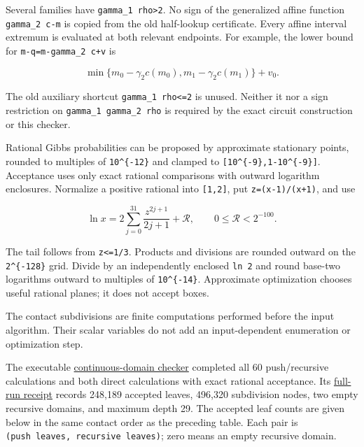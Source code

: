 Several families have \texttt{gamma\_1\ rho\textgreater{}2}. No sign of the generalized affine function \texttt{gamma\_2\ c-m} is copied from the old half-lookup certificate. Every affine interval extremum is evaluated at both relevant endpoints. For example, the lower bound for \texttt{m-q=m-gamma\_2\ c+v} is

\[
\min\{m_0-\gamma_2c(m_0),m_1-\gamma_2c(m_1)\}+v_0.
 \tag{XSS19}
\]

The old auxiliary shortcut \texttt{gamma\_1\ rho\textless{}=2} is unused. Neither it nor a sign restriction on \texttt{gamma\_1\ gamma\_2\ rho} is required by the exact circuit construction or this checker.

Rational Gibbs probabilities can be proposed by approximate stationary points, rounded to multiples of \texttt{10\^{}\{-12\}} and clamped to \texttt{{[}10\^{}\{-9\},1-10\^{}\{-9\}{]}}. Acceptance uses only exact rational comparisons with outward logarithm enclosures. Normalize a positive rational into \texttt{{[}1,2{]}}, put \texttt{z=(x-1)/(x+1)}, and use

\[
\ln x=2\sum_{j=0}^{31}\frac{z^{2j+1}}{2j+1}+\mathcal R,
 \qquad 0\le\mathcal R<2^{-100}.
 \tag{XSS20}
\]

The tail follows from \texttt{z\textless{}=1/3}. Products and divisions are rounded outward on the \texttt{2\^{}\{-128\}} grid. Divide by an independently enclosed \texttt{ln\ 2} and round base-two logarithms outward to multiples of \texttt{10\^{}\{-14\}}. Approximate optimization chooses useful rational planes; it does not accept boxes.

The contact subdivisions are finite computations performed before the input algorithm. Their scalar variables do not add an input-dependent enumeration or optimization step.

The executable \href{https://github.com/icekylinx/algorithm-frontier/blob/main/tools/verify_subset_sum_contacts.py}{continuous-domain checker} completed all 60 push/recursive calculations and both direct calculations with exact rational acceptance. Its \href{https://github.com/icekylinx/algorithm-frontier/blob/main/problems/subset-sum-fast-deterministic/verify/receipt.json}{full-run receipt} records 248,189 accepted leaves, 496,320 subdivision nodes, two empty recursive domains, and maximum depth 29. The accepted leaf counts are given below in the same contact order as the preceding table. Each pair is \texttt{(push\ leaves,\ recursive\ leaves)}; zero means an empty recursive domain.

